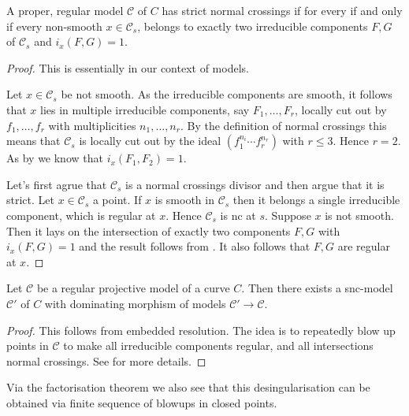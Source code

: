 \begin{proposition}
	A proper, regular model $\mathscr C$ of $C$ has strict normal crossings if for every if and only if every non-smooth $x \in \mathscr C_s$, belongs to exactly two irreducible components $F, G$ of $\mathscr C_s$ and $i_x(F, G) = 1$.  
\end{proposition}
\begin{proof}
	This is essentially \cite[prop.\ 9.1.8.(b)]{liuAlgebraicGeometryArithmetic2002} in our context of models. 

	\ltr Let $x \in \mathscr C_s$ be not smooth. 
	As the irreducible components are smooth, it follows that $x$ lies in multiple irreducible components, say $F_1, \ldots, F_r$, locally cut out by $f_1, \ldots, f_r$ with multiplicities $n_1, \ldots, n_r$. 
	By the definition of normal crossings this means that  $\mathscr C_s$ is locally cut out by the ideal $(f_1^{n_i}\cdots f_r^{n_r})$ with $r \le 3$. Hence  $r = 2$. 
	As by \cite[prop.\ 9.1.8.(b)]{liuAlgebraicGeometryArithmetic2002} we know that $i_x(F_1, F_2) = 1$. 

	\rtl Let's first agrue that $\mathscr C_s$ is a normal crossings divisor and then argue that it is strict.
	Let $x \in \mathscr C_s$ a point. If $x$ is smooth in $\mathscr C_s$ then it belongs a single irreducible component, which is regular at $x$. 
	Hence $\mathscr C_s$ is nc at $s$. 
	Suppose  $x$ is not smooth. Then it lays on the intersection of exactly two components $F, G$ with $i_x(F, G) = 1$ and the result follows from \cite[prop.\ 9.1.8.(b)]{liuAlgebraicGeometryArithmetic2002}.
	It also follows that $F, G$ are regular at $x$.
\end{proof}

\begin{theorem}
	Let $\mathscr C$ be a regular projective model of a curve $C$.
	Then there exists a snc-model $\mathscr C'$ of $C$ with dominating morphism of models $\mathscr C' \to \mathscr C$. 
\end{theorem}
\begin{proof}
	This follows from embedded resolution. 
	The idea is to repeatedly blow up points in $\mathscr C$ to make all irreducible components regular, and all intersections normal crossings. 
	See \cite[sec.\ 9.2.4]{liuAlgebraicGeometryArithmetic2002} for more details.
\end{proof}
Via the factorisation theorem we also see that this desingularisation can be obtained via finite sequence of blowups in closed points. 


